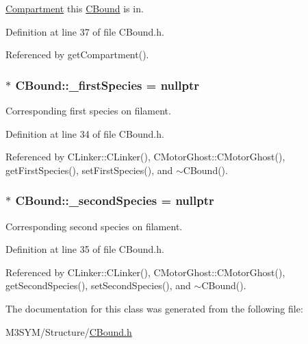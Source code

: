 \hyperlink{classCompartment}{Compartment} this \hyperlink{classCBound}{C\+Bound} is in. 



Definition at line 37 of file C\+Bound.\+h.



Referenced by get\+Compartment().

\hypertarget{classCBound_a7ee4f44fd39c414be1f7b74b1031c1ce}{
\subsubsection[{\+\_\+first\+Species}]{$\ast$ C\+Bound\+::\+\_\+first\+Species = nullptr\hspace{0.3cm}{\ttfamily [protected]}}}\label{classCBound_a7ee4f44fd39c414be1f7b74b1031c1ce}


Corresponding first species on filament. 



Definition at line 34 of file C\+Bound.\+h.



Referenced by C\+Linker\+::\+C\+Linker(), C\+Motor\+Ghost\+::\+C\+Motor\+Ghost(), get\+First\+Species(), set\+First\+Species(), and $\sim$\+C\+Bound().

\hypertarget{classCBound_ae6818ab861d273598a2507be75183e41}{
\subsubsection[{\+\_\+second\+Species}]{$\ast$ C\+Bound\+::\+\_\+second\+Species = nullptr\hspace{0.3cm}{\ttfamily [protected]}}}\label{classCBound_ae6818ab861d273598a2507be75183e41}


Corresponding second species on filament. 



Definition at line 35 of file C\+Bound.\+h.



Referenced by C\+Linker\+::\+C\+Linker(), C\+Motor\+Ghost\+::\+C\+Motor\+Ghost(), get\+Second\+Species(), set\+Second\+Species(), and $\sim$\+C\+Bound().



The documentation for this class was generated from the following file\+:\begin{DoxyCompactItemize}
\item 
M3\+S\+Y\+M/\+Structure/\hyperlink{CBound_8h}{C\+Bound.\+h}\end{DoxyCompactItemize}
